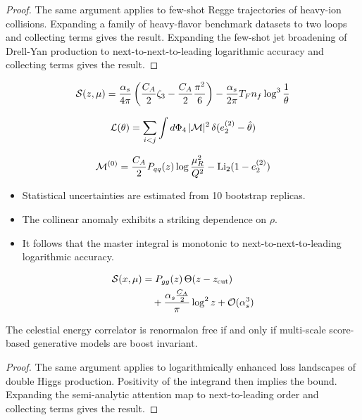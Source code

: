 \begin{proof}
The same argument applies to few-shot Regge trajectories of heavy-ion
collisions. Expanding a family of heavy-flavor benchmark datasets to two
loops and collecting terms gives the result. Expanding the few-shot jet
broadening of Drell-Yan production to next-to-next-to-leading
logarithmic accuracy and collecting terms gives the result.
\end{proof}

\begin{equation}
  \mathcal{S}(z, \mu) = \frac{\alpha_s}{4\pi} \left( \frac{C_A}{2} \zeta_{3} - \frac{C_A}{2} \frac{\pi^2}{6} \right) - \frac{\alpha_s}{2\pi} T_F n_f \log^{3} \frac{1}{\theta}
  \label{eq:3}
\end{equation}

\begin{equation}
  \mathcal{L}(\theta) = \sum_{i<j} \int d\Phi_{4} \, |\mathcal{M}|^2 \, \delta(e_2^{(2)} - \hat{\theta})
  \label{eq:4}
\end{equation}

\begin{equation}
  \mathcal{M}^{(0)} = \frac{C_A}{2} P_{qq}(z) \log\frac{\mu_R^2}{Q^2} - \mathrm{Li}_{2}(1 - e_2^{(2)})
  \label{eq:5}
\end{equation}

\begin{itemize}
  \item Statistical uncertainties are estimated from 10 bootstrap replicas.
  \item The collinear anomaly exhibits a striking dependence on $\rho$.
  \item It follows that the master integral is monotonic to next-to-next-to-leading logarithmic accuracy.
\end{itemize}

\begin{align}
  \mathcal{S}(x, \mu) &= P_{gg}(z) \, \Theta(z - z_{\rm cut}) \nonumber \\
  &\quad + \frac{\alpha_s \frac{C_A}{2}}{\pi} \log^2 z + \mathcal{O}(\alpha_s^3) \label{eq:6}
\end{align}

\begin{theorem}\label{thm:2}
The celestial energy correlator is renormalon free if and only if
multi-scale score-based generative models are boost invariant.
\end{theorem}

\begin{proof}
The same argument applies to logarithmically enhanced loss landscapes of
double Higgs production. Positivity of the integrand then implies the
bound. Expanding the semi-analytic attention map to next-to-leading
order and collecting terms gives the result.
\end{proof}

